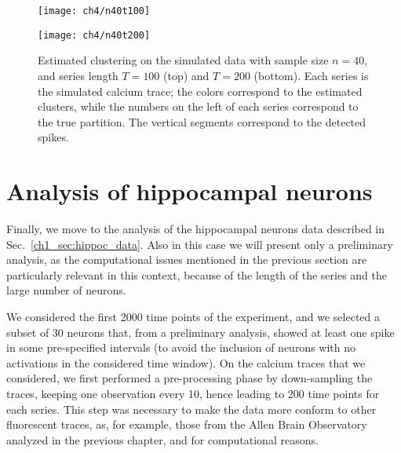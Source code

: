 \begin{figure}
	\centering
	\texttt{[image: ch4/n40t100]}\\
	\centerline{
	\texttt{[image: ch4/n40t200]}
}
	\label{ch4:fig_n40}
	\caption[Estimated clustering on the simulated data with sample size $n=40$.]{Estimated clustering on the simulated data with sample size $n=40$, and series length $T=100$ (top) and $T=200$ (bottom). Each series is the simulated calcium trace; the colors correspond to the estimated clusters, while the numbers on the left of each series correspond to the true partition. The vertical segments correspond to the detected spikes.}
\end{figure}





\section{Analysis of hippocampal neurons}
Finally, we move to the analysis of the hippocampal neurons data described in Sec.~\ref{ch1_sec:hippoc_data}. 
Also in this case we will present only a preliminary analysis, as the computational issues mentioned in the previous section are particularly relevant in this context, because of the length of the series and the large number of neurons. 

We considered the first 2000 time points of the experiment, and we selected a subset of 30 neurons that, from a preliminary analysis, showed at least one spike in some pre-specified intervals (to avoid the inclusion of neurons with no activations in the considered time window).
On the calcium traces that we considered, we first performed a pre-processing phase by down-sampling the traces, keeping one observation every 10, hence leading to 200 time points for each series. This step was necessary to make the data more conform to other fluorescent traces, as, for example, those from the Allen Brain Observatory analyzed in the previous chapter, and for computational reasons.

